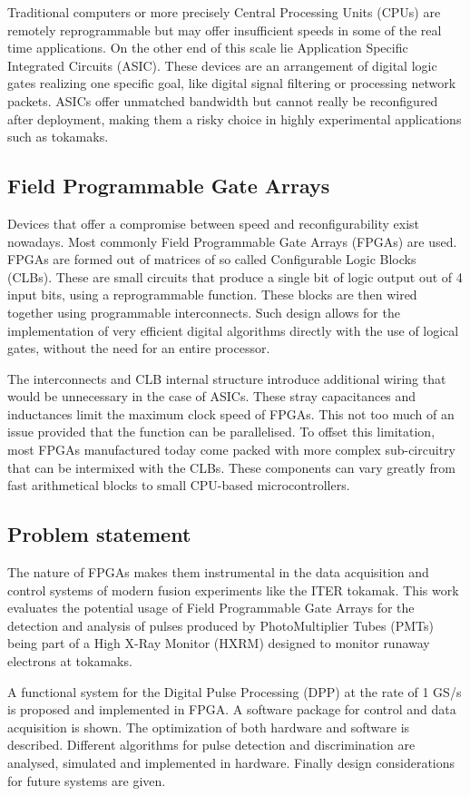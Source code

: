 	Traditional computers or more precisely Central Processing Units (CPUs) 
	are remotely reprogrammable but may offer insufficient speeds in 
	some of the real time applications. On the other end of this scale lie 
	Application Specific Integrated Circuits (ASIC). These devices are an 
	arrangement of digital logic gates realizing one specific goal, like 
	digital signal filtering or processing network packets.
	ASICs offer unmatched bandwidth but cannot really be reconfigured
	after deployment, making them a risky choice in highly experimental
	applications such as tokamaks.

\subsection{Field Programmable Gate Arrays}
Devices that offer a compromise between speed and reconfigurability
exist nowadays. Most commonly Field Programmable Gate Arrays (FPGAs) are used.
FPGAs are formed out of matrices of so called Configurable Logic Blocks (CLBs).
These are small circuits that produce a single bit of logic output
out of 4 input bits, using a reprogrammable function. These blocks 
are then wired together using programmable interconnects. Such design 
allows for the implementation of very efficient digital algorithms
directly with the use of logical gates, without the need for an
entire processor. \cite{xilinx_what_is_fpga}


The interconnects and CLB internal structure introduce additional wiring
that would be unnecessary in the case of ASICs. These stray capacitances 
and inductances limit the maximum clock speed of FPGAs. This not too much
of an issue provided that the function can be parallelised. To offset 
this limitation, most FPGAs manufactured today come packed with 
more complex sub-circuitry that can be intermixed with the CLBs.
These components can vary greatly from fast arithmetical blocks
to small CPU-based microcontrollers.

\subsection{Problem statement}

The nature of FPGAs makes them instrumental in the data acquisition 
and control systems of modern fusion experiments like the ITER tokamak.
This work evaluates the potential usage of Field Programmable Gate Arrays
for the detection and analysis of pulses produced by PhotoMultiplier Tubes (PMTs)
being part of a High X-Ray Monitor (HXRM) designed to monitor runaway electrons
at tokamaks.


A functional system for the Digital Pulse Processing (DPP) at the rate of 
1 GS/s is proposed and implemented in FPGA. A software package for control
and data acquisition is shown. The optimization of both hardware and software
is described. Different algorithms for pulse detection and discrimination
are analysed, simulated and implemented in hardware. Finally design
considerations for future systems are given.
